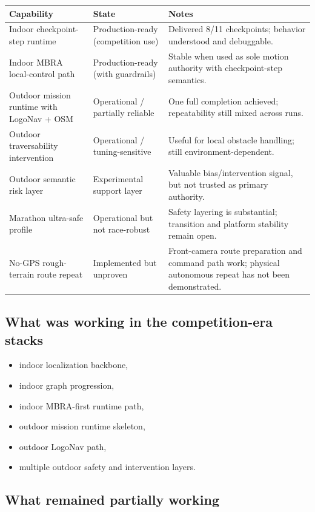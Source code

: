 \documentclass[11pt]{article}
\begin{document}
\begin{longtable}{p{}p{}p{}}
\toprule
\textbf{Capability} & \textbf{State} & \textbf{Notes} \\
\midrule
Indoor checkpoint-step runtime & Production-ready (competition use) & Delivered 8/11 checkpoints; behavior understood and debuggable. \\
Indoor MBRA local-control path & Production-ready (with guardrails) & Stable when used as sole motion authority with checkpoint-step semantics. \\
Outdoor mission runtime with LogoNav + OSM & Operational / partially reliable & One full completion achieved; repeatability still mixed across runs. \\
Outdoor traversability intervention & Operational / tuning-sensitive & Useful for local obstacle handling; still environment-dependent. \\
Outdoor semantic risk layer & Experimental support layer & Valuable bias/intervention signal, but not trusted as primary authority. \\
Marathon ultra-safe profile & Operational but not race-robust & Safety layering is substantial; transition and platform stability remain open. \\
No-GPS rough-terrain route repeat & Implemented but unproven & Front-camera route preparation and command path work; physical autonomous repeat has not been demonstrated. \\
\bottomrule
\end{longtable}

\subsection*{What was working in the competition-era stacks}

\begin{itemize}[nosep]
  \item indoor localization backbone,
  \item indoor graph progression,
  \item indoor MBRA-first runtime path,
  \item outdoor mission runtime skeleton,
  \item outdoor LogoNav path,
  \item multiple outdoor safety and intervention layers.
\end{itemize}

\subsection*{What remained partially working}
\end{document}
